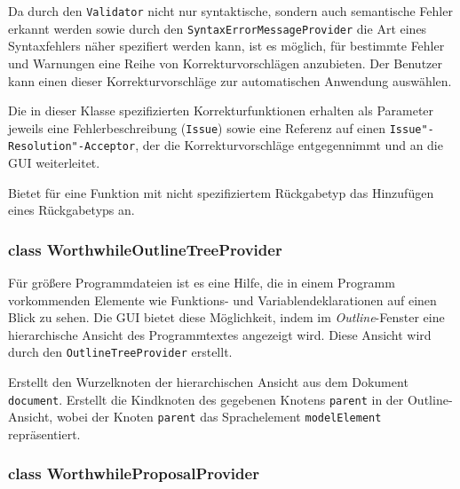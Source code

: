 Da durch den \texttt{Validator} nicht nur syntaktische, sondern auch semantische Fehler erkannt werden sowie durch den \texttt{SyntaxErrorMessageProvider} die Art eines Syntaxfehlers näher spezifiert werden kann, ist es möglich, für bestimmte Fehler und Warnungen eine Reihe von Korrekturvorschlägen anzubieten. Der Benutzer kann einen dieser Korrekturvorschläge zur automatischen Anwendung auswählen.

Die in dieser Klasse spezifizierten Korrekturfunktionen erhalten als Parameter jeweils eine Fehlerbeschreibung (\texttt{Issue}) sowie eine Referenz auf einen \texttt{Issue"-Resolution"-Acceptor}, der die Korrekturvorschläge entgegennimmt und an die GUI weiterleitet.

\begin{description}
	 Bietet für eine Funktion mit nicht spezifiziertem Rückgabetyp das Hinzufügen eines Rückgabetyps an.
\end{description}

\subsubsection{class WorthwhileOutlineTreeProvider}

Für größere Programmdateien ist es eine Hilfe, die in einem Programm vorkommenden Elemente wie Funktions- und Variablendeklarationen auf einen Blick zu sehen. Die GUI bietet diese Möglichkeit, indem im \textit{Outline}-Fenster eine hierarchische Ansicht des Programmtextes angezeigt wird. Diese Ansicht wird durch den \texttt{OutlineTreeProvider} erstellt.

\begin{description}
	 Erstellt den Wurzelknoten der hierarchischen Ansicht aus dem Dokument \texttt{document}.
	 Erstellt die Kindknoten des gegebenen Knotens \texttt{parent} in der Outline-Ansicht, wobei der Knoten \texttt{parent} das Sprachelement \texttt{modelElement} repräsentiert.
\end{description}

\subsubsection{class WorthwhileProposalProvider}

